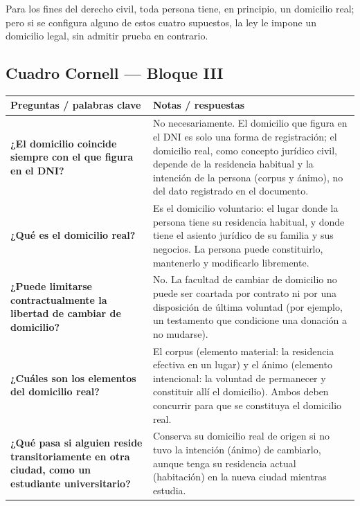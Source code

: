 \documentclass[12pt,oneside]{book}
\begin{document}
Para los fines del derecho civil, toda persona tiene, en principio, un domicilio real; pero si se configura alguno de estos cuatro supuestos, la ley le impone un domicilio legal, sin admitir prueba en contrario.

\subsection*{Cuadro Cornell --- Bloque III}

\begin{table}[H]
\centering
\begin{tabularx}{\textwidth}{
    >{\raggedright\arraybackslash}p{}
    >{\raggedright\arraybackslash}X
}
\toprule
\textbf{Preguntas / palabras clave} & \textbf{Notas / respuestas} \\
\midrule

\textbf{¿El domicilio coincide siempre con el que figura en el DNI?} &
No necesariamente. El domicilio que figura en el DNI es solo una forma de registración; el domicilio real, como concepto jurídico civil, depende de la residencia habitual y la intención de la persona (corpus y ánimo), no del dato registrado en el documento. \\

\textbf{¿Qué es el domicilio real?} &
Es el domicilio voluntario: el lugar donde la persona tiene su residencia habitual, y donde tiene el asiento jurídico de su familia y sus negocios. La persona puede constituirlo, mantenerlo y modificarlo libremente. \\

\textbf{¿Puede limitarse contractualmente la libertad de cambiar de domicilio?} &
No. La facultad de cambiar de domicilio no puede ser coartada por contrato ni por una disposición de última voluntad (por ejemplo, un testamento que condicione una donación a no mudarse). \\

\textbf{¿Cuáles son los elementos del domicilio real?} &
El corpus (elemento material: la residencia efectiva en un lugar) y el ánimo (elemento intencional: la voluntad de permanecer y constituir allí el domicilio). Ambos deben concurrir para que se constituya el domicilio real. \\

\textbf{¿Qué pasa si alguien reside transitoriamente en otra ciudad, como un estudiante universitario?} &
Conserva su domicilio real de origen si no tuvo la intención (ánimo) de cambiarlo, aunque tenga su residencia actual (habitación) en la nueva ciudad mientras estudia. \\


\end{tabularx}
\end{table}
\end{document}
